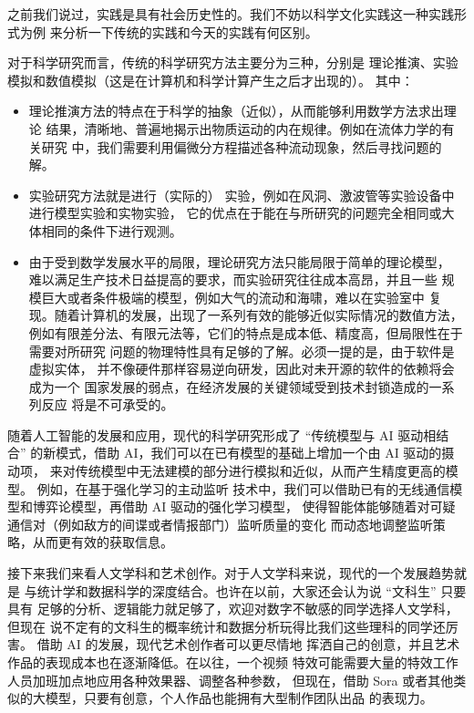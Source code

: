 \documentclass[utf-8, 10pt]{article}
\begin{document}
{
\small
之前我们说过，实践是具有社会历史性的。我们不妨以科学文化实践这一种实践形式为例
来分析一下传统的实践和今天的实践有何区别。

对于科学研究而言，传统的科学研究方法主要分为三种，分别是
理论推演、实验模拟和数值模拟（这是在计算机和科学计算产生之后才出现的）。
其中：
\begin{itemize}[itemsep=0pt]
    \item 理论推演方法的特点在于科学的抽象（近似），从而能够利用数学方法求出理论
    结果，清晰地、普遍地揭示出物质运动的内在规律。例如在流体力学的有关研究
    中，我们需要利用偏微分方程描述各种流动现象，然后寻找问题的解。
    \item 实验研究方法就是进行（实际的）
    实验，例如在风洞、激波管等实验设备中进行模型实验和实物实验，
    它的优点在于能在与所研究的问题完全相同或大体相同的条件下进行观测。
    \item 由于受到数学发展水平的局限，理论研究方法只能局限于简单的理论模型，
    难以满足生产技术日益提高的要求，而实验研究往往成本高昂，并且一些
    规模巨大或者条件极端的模型，例如大气的流动和海啸，难以在实验室中
    复现。随着计算机的发展，出现了一系列有效的能够近似实际情况的数值方法，
    例如有限差分法、有限元法等，它们的特点是成本低、精度高，但局限性在于需要对所研究
    问题的物理特性具有足够的了解。必须一提的是，由于软件是虚拟实体，
    并不像硬件那样容易逆向研发，因此对未开源的软件的依赖将会成为一个
    国家发展的弱点，在经济发展的关键领域受到技术封锁造成的一系列反应
    将是不可承受的。
\end{itemize}
随着人工智能的发展和应用，现代的科学研究形成了 “传统模型与 AI 驱动相结合”
的新模式，借助 AI，我们可以在已有模型的基础上增加一个由 AI 驱动的摄动项，
来对传统模型中无法建模的部分进行模拟和近似，从而产生精度更高的模型。
例如，在基于强化学习的主动监听
技术中，我们可以借助已有的无线通信模型和博弈论模型，再借助 AI 驱动的强化学习模型，
使得智能体能够随着对可疑通信对（例如敌方的间谍或者情报部门）监听质量的变化
而动态地调整监听策略，从而更有效的获取信息。

接下来我们来看人文学科和艺术创作。对于人文学科来说，现代的一个发展趋势就是
与统计学和数据科学的深度结合。也许在以前，大家还会认为说 “文科生” 只要具有
足够的分析、逻辑能力就足够了，欢迎对数字不敏感的同学选择人文学科，但现在
说不定有的文科生的概率统计和数据分析玩得比我们这些理科的同学还厉害。
借助 AI 的发展，现代艺术创作者可以更尽情地
挥洒自己的创意，并且艺术作品的表现成本也在逐渐降低。在以往，一个视频
特效可能需要大量的特效工作人员加班加点地应用各种效果器、调整各种参数，
但现在，借助 Sora 或者其他类似的大模型，只要有创意，个人作品也能拥有大型制作团队出品
的表现力。}
\end{document}
